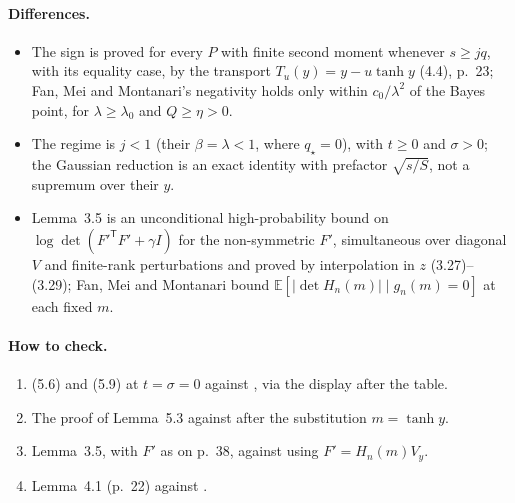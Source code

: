 \documentclass[11pt]{article}
\newcommand{\E}{\mathbb{E}}
\newcommand{\ploc}[2]{#1}
\newcommand{\sloc}[2]{\cite[#2]{#1}}
\begin{document}
\paragraph{Differences.}
\begin{itemize}
\item The sign is proved for every $P$ with finite second moment whenever
$s\ge jq$, with its equality case, by the transport $T_u(y)=y-u\tanh y$
\ploc{(4.4), p.~23}{entropy.tex:62--83}; Fan, Mei and Montanari's negativity
holds only within $c_0/\lambda^2$ of the Bayes point, for $\lambda\ge\lambda_0$
and $Q\ge\eta>0$.
\item The regime is $j<1$ (their $\beta=\lambda<1$, where $q_\star=0$), with
$t\ge0$ and $\sigma>0$; the Gaussian reduction is an exact identity with
prefactor $\sqrt{s/S}$, not a supremum over their $y$.
\item \ploc{Lemma~3.5}{matrices.tex:721--742} is an unconditional
high-probability bound on $\log\det(F'^{\mathsf T}F'+\gamma I)$ for the
non-symmetric $F'$, simultaneous over diagonal $V$ and finite-rank
perturbations and proved by interpolation in $z$
\ploc{(3.27)--(3.29)}{matrices.tex:743--812}; Fan, Mei and Montanari bound
$\E[|\det H_n(m)|\mid g_n(m)=0]$ at each fixed $m$.
\end{itemize}

\paragraph{How to check.}
\begin{enumerate}
\item \ploc{(5.6)}{stability.tex:136--145} and \ploc{(5.9)}{stability.tex:205--214}
at $t=\sigma=0$ against
\sloc{FanMeiMontanari2018-TAPFreeEnergyVariationalInference}{\S3.4, p.~11},
via the display after the table.
\item The proof of \ploc{Lemma~5.3}{stability.tex:173--203} against
\sloc{FanMeiMontanari2018-TAPFreeEnergyVariationalInference}{Lemma~3.3 and Cor.~3.4, pp.~9--10}
after the substitution $m=\tanh y$.
\item \ploc{Lemma~3.5}{matrices.tex:721--742}, with $F'$ as on
\ploc{p.~38}{stability.tex:938--947}, against
\sloc{FanMeiMontanari2018-TAPFreeEnergyVariationalInference}{Prop.~3.2, (3.5), p.~9}
using $F'=H_n(m)V_y$.
\item \ploc{Lemma~4.1 (p.~22)}{entropy.tex:16--31} against
\sloc{FanMeiMontanari2018-TAPFreeEnergyVariationalInference}{Prop.~5.2, p.~22}.
\end{enumerate}
\end{document}
